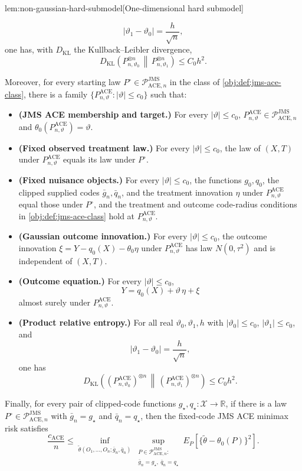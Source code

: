 \documentclass[11pt]{article}
\begin{document}
\begin{lemmav}{lem:non-gaussian-hard-submodel}[One-dimensional hard submodel]
\begin{itemize}
\[
|\vartheta_1-\vartheta_0|=\frac{h}{\sqrt n},
\]
one has, with \(D_{\mathrm{KL}}\) the Kullback--Leibler divergence,
\[
D_{\mathrm{KL}}\!\left(P_{n,\vartheta_0}^{\otimes n}\,\middle\|\,P_{n,\vartheta_1}^{\otimes n}\right)
\le C_0 h^2 .
\]
\end{itemize}
Moreover, for every starting law \(P^{\circ}\in\mathcal P_{\mathrm{ACE},n}^{\mathrm{JMS}}\) in the class of \cref{obj:def:jms-ace-class}, there is a family \(\{P_{n,\vartheta}^{\mathrm{ACE}}:|\vartheta|\le c_0\}\) such that:
\begin{itemize}
\item \textbf{(JMS ACE membership and target.)} For every \(|\vartheta|\le c_0\), \(P_{n,\vartheta}^{\mathrm{ACE}}\in\mathcal P_{\mathrm{ACE},n}^{\mathrm{JMS}}\) and \(\theta_0(P_{n,\vartheta}^{\mathrm{ACE}})=\vartheta\).
\item \textbf{(Fixed observed treatment law.)} For every \(|\vartheta|\le c_0\), the law of \((X,T)\) under \(P_{n,\vartheta}^{\mathrm{ACE}}\) equals its law under \(P^{\circ}\).
\item \textbf{(Fixed nuisance objects.)} For every \(|\vartheta|\le c_0\), the functions \(g_0,q_0\), the clipped supplied codes \(\bar g_n,\bar q_n\), and the treatment innovation \(\eta\) under \(P_{n,\vartheta}^{\mathrm{ACE}}\) equal those under \(P^{\circ}\), and the treatment and outcome code-radius conditions in \cref{obj:def:jms-ace-class} hold at \(P_{n,\vartheta}^{\mathrm{ACE}}\).
\item \textbf{(Gaussian outcome innovation.)} For every \(|\vartheta|\le c_0\), the outcome innovation \(\xi=Y-q_0(X)-\theta_0\eta\) under \(P_{n,\vartheta}^{\mathrm{ACE}}\) has law \(N(0,\tau^2)\) and is independent of \((X,T)\).
\item \textbf{(Outcome equation.)} For every \(|\vartheta|\le c_0\),
\[
Y=q_0(X)+\vartheta\,\eta+\xi
\]
almost surely under \(P_{n,\vartheta}^{\mathrm{ACE}}\).
\item \textbf{(Product relative entropy.)} For all real \(\vartheta_0,\vartheta_1,h\) with \(|\vartheta_0|\le c_0\), \(|\vartheta_1|\le c_0\), and
\[
|\vartheta_1-\vartheta_0|=\frac{h}{\sqrt n},
\]
one has
\[
D_{\mathrm{KL}}\!\left((P_{n,\vartheta_0}^{\mathrm{ACE}})^{\otimes n}\,\middle\|\,(P_{n,\vartheta_1}^{\mathrm{ACE}})^{\otimes n}\right)
\le C_0 h^2 .
\]
\end{itemize}
Finally, for every pair of clipped-code functions \(g_{\star},q_{\star}:\mathcal X\to\mathbb R\), if there is a law \(P^{\circ}\in\mathcal P_{\mathrm{ACE},n}^{\mathrm{JMS}}\) with \(\bar g_n=g_{\star}\) and \(\bar q_n=q_{\star}\), then the fixed-code JMS ACE minimax risk satisfies
\[
\frac{c_{\mathrm{ACE}}}{n}
\le
\inf_{\widetilde\theta(O_1,\ldots,O_n;\bar g_n,\bar q_n)}
\sup_{\substack{P\in\mathcal P_{\mathrm{ACE},n}^{\mathrm{JMS}}:\\ \bar g_n=g_{\star},\ \bar q_n=q_{\star}}}
E_P\!\left[\{\widetilde\theta-\theta_0(P)\}^2\right].
\]
\end{lemmav}
\end{document}
